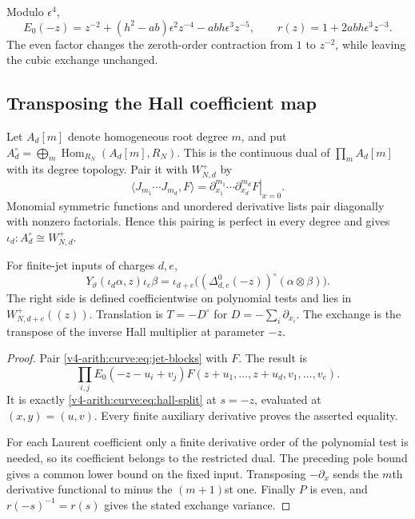 Modulo $\epsilon^4$,
\begin{equation}\label{v4-arith:curve:eq:cubic-jet}
 E_0(-z)=z^{-2}+(h^2-ab)\epsilon^2z^{-4}
                   -abh\epsilon^3z^{-5},\qquad
 r(z)=1+2abh\epsilon^3z^{-3}.
\end{equation}
The even factor changes the zeroth-order contraction from
$1$ to $z^{-2}$, while leaving the cubic exchange unchanged.

\subsection{Transposing the Hall coefficient map}

Let $A_d[m]$ denote homogeneous root degree $m$, and put
$A_d^\circ=\bigoplus_m\operatorname{Hom}_{R_N}(A_d[m],R_N)$.
This is the continuous dual of $\prod_mA_d[m]$ with its
degree topology. Pair it with $W_{N,d}^+$ by
\begin{equation}\label{v4-arith:curve:eq:jet-pairing}
 \langle J_{m_1}\cdots J_{m_d},F\rangle
 =\left.\partial_{x_1}^{m_1}\cdots\partial_{x_d}^{m_d}
                           F\right|_{x=0}.
\end{equation}
Monomial symmetric functions and unordered derivative
lists pair diagonally with nonzero factorials. Hence this
pairing is perfect in every degree and gives
$\iota_d:A_d^\circ\cong W_{N,d}^+$.

\begin{theorem}\label{v4-arith:curve:thm:transpose}
For finite-jet inputs of charges $d,e$,
\[
 Y_\vartheta(\iota_d\alpha,z)\iota_e\beta
 =\iota_{d+e}\bigl((\Delta^0_{d,e}(-z))^\circ
                                      (\alpha\otimes\beta)\bigr).
\]
The right side is defined coefficientwise on polynomial
tests and lies in $W_{N,d+e}^+((z))$.
Translation is $T=-D^\circ$ for
$D=-\sum_i\partial_{x_i}$.
The exchange is the transpose of the inverse Hall
multiplier at parameter $-z$.
\end{theorem}
\begin{proof}
Pair \eqref{v4-arith:curve:eq:jet-blocks} with $F$.
The result is
\[
 \prod_{i,j}E_0(-z-u_i+v_j)
     F(z+u_1,\ldots,z+u_d,v_1,\ldots,v_e).
\]
It is exactly \eqref{v4-arith:curve:eq:hall-split} at $s=-z$,
evaluated at $(x,y)=(u,v)$. Every finite auxiliary
derivative proves the asserted equality.

For each Laurent coefficient only a finite derivative
order of the polynomial test is needed, so its coefficient
belongs to the restricted dual. The preceding pole bound
gives a common lower bound on the fixed input.
Transposing $-\partial_x$ sends the $m$th derivative
functional to minus the $(m+1)$st one.
Finally $P$ is even, and
$r(-s)^{-1}=r(s)$ gives the stated exchange variance.
\end{proof}

